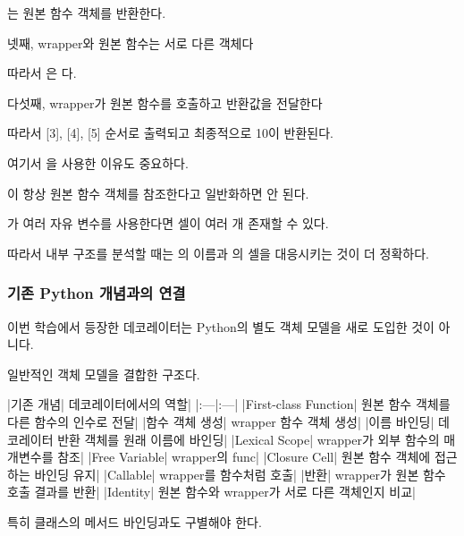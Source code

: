 는 원본 함수 객체를 반환한다.

\begin{dhknote}
\begin{dhksmry}[centered]
넷째, wrapper와 원본 함수는 서로 다른 객체다
\end{dhksmry}
\end{dhknote}

따라서 은 다.

\begin{dhknote}
\begin{dhksmry}[centered]
다섯째, wrapper가 원본 함수를 호출하고 반환값을 전달한다
\end{dhksmry}
\end{dhknote}

따라서 [3], [4], [5] 순서로 출력되고 최종적으로 10이 반환된다.

여기서 을 사용한 이유도 중요하다.

이 항상 원본 함수 객체를 참조한다고 일반화하면 안 된다.

가 여러 자유 변수를 사용한다면 셀이 여러 개 존재할 수 있다.

따라서 내부 구조를 분석할 때는 의 이름과 의 셀을 대응시키는 것이 더 정확하다.

\subsubsection{기존 Python 개념과의 연결}

이번 학습에서 등장한 데코레이터는 Python의 별도 객체 모델을 새로 도입한 것이 아니다.

일반적인 객체 모델을 결합한 구조다.

\begin{dhktable}
|기존 개념|	데코레이터에서의 역할|
|:---|:---|
|First-class Function|	원본 함수 객체를 다른 함수의 인수로 전달|
|함수 객체 생성|	wrapper 함수 객체 생성|
|이름 바인딩|	데코레이터 반환 객체를 원래 이름에 바인딩|
|Lexical Scope|	wrapper가 외부 함수의 매개변수를 참조|
|Free Variable|	wrapper의 func|
|Closure Cell|	원본 함수 객체에 접근하는 바인딩 유지|
|Callable|	wrapper를 함수처럼 호출|
|반환|	wrapper가 원본 함수 호출 결과를 반환|
|Identity|	원본 함수와 wrapper가 서로 다른 객체인지 비교|
\end{dhktable}

특히 클래스의 메서드 바인딩과도 구별해야 한다.

